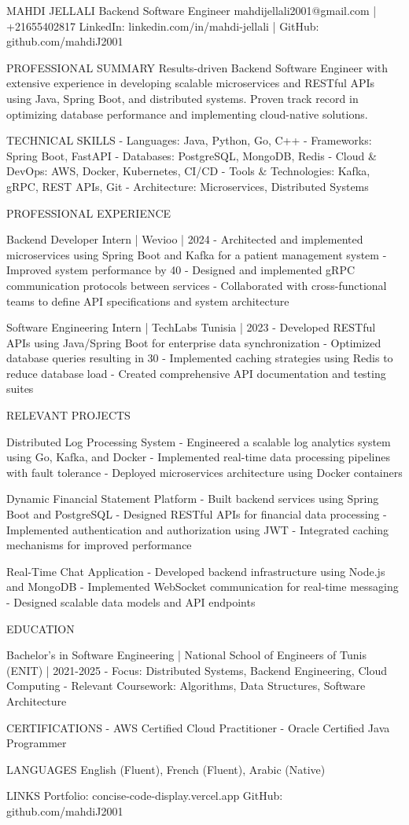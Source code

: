 MAHDI JELLALI
Backend Software Engineer
mahdijellali2001@gmail.com | +21655402817
LinkedIn: linkedin.com/in/mahdi-jellali | GitHub: github.com/mahdiJ2001

PROFESSIONAL SUMMARY
Results-driven Backend Software Engineer with extensive experience in developing scalable microservices and RESTful APIs using Java, Spring Boot, and distributed systems. Proven track record in optimizing database performance and implementing cloud-native solutions.

TECHNICAL SKILLS
- Languages: Java, Python, Go, C++
- Frameworks: Spring Boot, FastAPI
- Databases: PostgreSQL, MongoDB, Redis
- Cloud & DevOps: AWS, Docker, Kubernetes, CI/CD
- Tools & Technologies: Kafka, gRPC, REST APIs, Git
- Architecture: Microservices, Distributed Systems

PROFESSIONAL EXPERIENCE

Backend Developer Intern | Wevioo | 2024
- Architected and implemented microservices using Spring Boot and Kafka for a patient management system
- Improved system performance by 40%
- Designed and implemented gRPC communication protocols between services
- Collaborated with cross-functional teams to define API specifications and system architecture

Software Engineering Intern | TechLabs Tunisia | 2023
- Developed RESTful APIs using Java/Spring Boot for enterprise data synchronization
- Optimized database queries resulting in 30%
- Implemented caching strategies using Redis to reduce database load
- Created comprehensive API documentation and testing suites

RELEVANT PROJECTS

Distributed Log Processing System
- Engineered a scalable log analytics system using Go, Kafka, and Docker
- Implemented real-time data processing pipelines with fault tolerance
- Deployed microservices architecture using Docker containers

Dynamic Financial Statement Platform
- Built backend services using Spring Boot and PostgreSQL
- Designed RESTful APIs for financial data processing
- Implemented authentication and authorization using JWT
- Integrated caching mechanisms for improved performance

Real-Time Chat Application
- Developed backend infrastructure using Node.js and MongoDB
- Implemented WebSocket communication for real-time messaging
- Designed scalable data models and API endpoints

EDUCATION

Bachelor's in Software Engineering | National School of Engineers of Tunis (ENIT) | 2021-2025
- Focus: Distributed Systems, Backend Engineering, Cloud Computing
- Relevant Coursework: Algorithms, Data Structures, Software Architecture

CERTIFICATIONS
- AWS Certified Cloud Practitioner
- Oracle Certified Java Programmer

LANGUAGES
English (Fluent), French (Fluent), Arabic (Native)

LINKS
Portfolio: concise-code-display.vercel.app
GitHub: github.com/mahdiJ2001